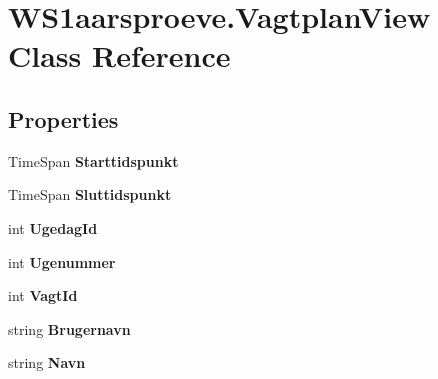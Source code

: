\hypertarget{class_w_s1aarsproeve_1_1_vagtplan_view}{}\section{W\+S1aarsproeve.\+Vagtplan\+View Class Reference}
\label{class_w_s1aarsproeve_1_1_vagtplan_view}
\subsection*{Properties}
\begin{DoxyCompactItemize}
\item 
\hypertarget{class_w_s1aarsproeve_1_1_vagtplan_view_adc48694b4af1cb9f077fe13b6b30f1f1}{}Time\+Span {\bfseries Starttidspunkt}\label{class_w_s1aarsproeve_1_1_vagtplan_view_adc48694b4af1cb9f077fe13b6b30f1f1}

\item 
\hypertarget{class_w_s1aarsproeve_1_1_vagtplan_view_a5179686266cff89bfe916c18c0722743}{}Time\+Span {\bfseries Sluttidspunkt}\label{class_w_s1aarsproeve_1_1_vagtplan_view_a5179686266cff89bfe916c18c0722743}

\item 
\hypertarget{class_w_s1aarsproeve_1_1_vagtplan_view_ad713e84f33db3568e87b2cb5982d6442}{}int {\bfseries Ugedag\+Id}\label{class_w_s1aarsproeve_1_1_vagtplan_view_ad713e84f33db3568e87b2cb5982d6442}

\item 
\hypertarget{class_w_s1aarsproeve_1_1_vagtplan_view_a396b67b41135d78531902367b80beb2a}{}int {\bfseries Ugenummer}\label{class_w_s1aarsproeve_1_1_vagtplan_view_a396b67b41135d78531902367b80beb2a}

\item 
\hypertarget{class_w_s1aarsproeve_1_1_vagtplan_view_a42c2882ec6ffbc40c0f3a7402d38728c}{}int {\bfseries Vagt\+Id}\label{class_w_s1aarsproeve_1_1_vagtplan_view_a42c2882ec6ffbc40c0f3a7402d38728c}

\item 
\hypertarget{class_w_s1aarsproeve_1_1_vagtplan_view_a966c322e5b30d9e55692d5c645f2f730}{}string {\bfseries Brugernavn}\label{class_w_s1aarsproeve_1_1_vagtplan_view_a966c322e5b30d9e55692d5c645f2f730}

\item 
\hypertarget{class_w_s1aarsproeve_1_1_vagtplan_view_ac90899ff9f77ad45fdf69d4f0eb28ce5}{}string {\bfseries Navn}\label{class_w_s1aarsproeve_1_1_vagtplan_view_ac90899ff9f77ad45fdf69d4f0eb28ce5}

\end{DoxyCompactItemize}


